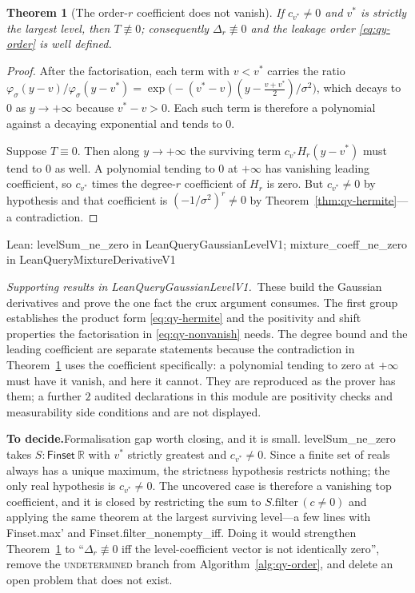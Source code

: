 \documentclass[conference]{IEEEtran}
\newtheorem{theorem}{Theorem}
\theoremstyle{definition}
\newcommand{\lean}[1]{\textsf{\footnotesize #1}}
\newcommand{\leanbox}[1]{%
  \par\vspace{2pt}\noindent
  {\footnotesize\textsf{Lean: #1}}\par\vspace{2pt}}
\newif\ifshownotes\shownotestrue
\newcommand{\TODOPAR}[1]{\ifshownotes\par\vspace{2pt}\noindent%
  {\color{todocol}\textsf{\footnotesize\textbf{To decide.}\;#1}}\par\vspace{2pt}\fi}
\begin{document}
\begin{theorem}[The order-$r$ coefficient does not vanish]
\label{thm:qy-nonvanish}
If $c_{v^{*}}\neq0$ and $v^{*}$ is strictly the largest level, then $T\not\equiv0$;
consequently $\Delta_{r}\not\equiv0$ and the leakage order \eqref{eq:qy-order} is well defined.
\end{theorem}

\begin{proof}
After the factorisation, each term with $v<v^{*}$ carries the ratio
$\varphi_{\sigma}(y-v)/\varphi_{\sigma}(y-v^{*})
=\exp\bigl(-(v^{*}-v)(y-\tfrac{v+v^{*}}{2})/\sigma^{2}\bigr)$, which decays to $0$ as
$y\to+\infty$ because $v^{*}-v>0$. Each such term is therefore a polynomial against a
decaying exponential and tends to $0$.

Suppose $T\equiv0$. Then along $y\to+\infty$ the surviving term $c_{v^{*}}H_{r}(y-v^{*})$
must tend to $0$ as well. A polynomial tending to $0$ at $+\infty$ has vanishing leading
coefficient, so $c_{v^{*}}$ times the degree-$r$ coefficient of $H_{r}$ is zero. But
$c_{v^{*}}\neq0$ by hypothesis and that coefficient is $(-1/\sigma^{2})^{r}\neq0$ by
Theorem~\ref{thm:qy-hermite}---a contradiction.
\end{proof}

\leanbox{\lean{levelSum\_ne\_zero} in \lean{LeanQueryGaussianLevelV1};
\lean{mixture\_coeff\_ne\_zero} in \lean{LeanQueryMixtureDerivativeV1}}

\noindent\emph{Supporting results in \lean{LeanQueryGaussianLevelV1}.}~These build the Gaussian derivatives and prove the one fact the crux argument consumes. The first group establishes the product form \eqref{eq:qy-hermite} and the positivity and shift properties the factorisation in \eqref{eq:qy-nonvanish} needs. The degree bound and the leading coefficient are separate statements because the contradiction in Theorem~\ref{thm:qy-nonvanish} uses the coefficient specifically: a polynomial tending to zero at $+\infty$ must have it vanish, and here it cannot. They are reproduced as the prover has them; a further $2$ audited declarations in this module are positivity checks and measurability side conditions and are not displayed.
\TODOPAR{Formalisation gap worth closing, and it is small. \lean{levelSum\_ne\_zero}
takes $S:\mathsf{Finset}\ \mathbb{R}$ with $v^{*}$ strictly greatest and $c_{v^{*}}\neq0$.
Since a finite set of reals always has a unique maximum, the strictness hypothesis restricts
nothing; the only real hypothesis is $c_{v^{*}}\neq0$. The uncovered case is therefore a
vanishing top coefficient, and it is closed by restricting the sum to
$S.\mathrm{filter}\,(c\neq0)$ and applying the same theorem at the largest surviving level---a
few lines with \lean{Finset.max'} and \lean{Finset.filter\_nonempty\_iff}. Doing it would
strengthen Theorem~\ref{thm:qy-nonvanish} to ``$\Delta_{r}\not\equiv0$ iff the level-coefficient
vector is not identically zero'', remove the \textsc{undetermined} branch from
Algorithm~\ref{alg:qy-order}, and delete an open problem that does not exist.}
\end{document}
